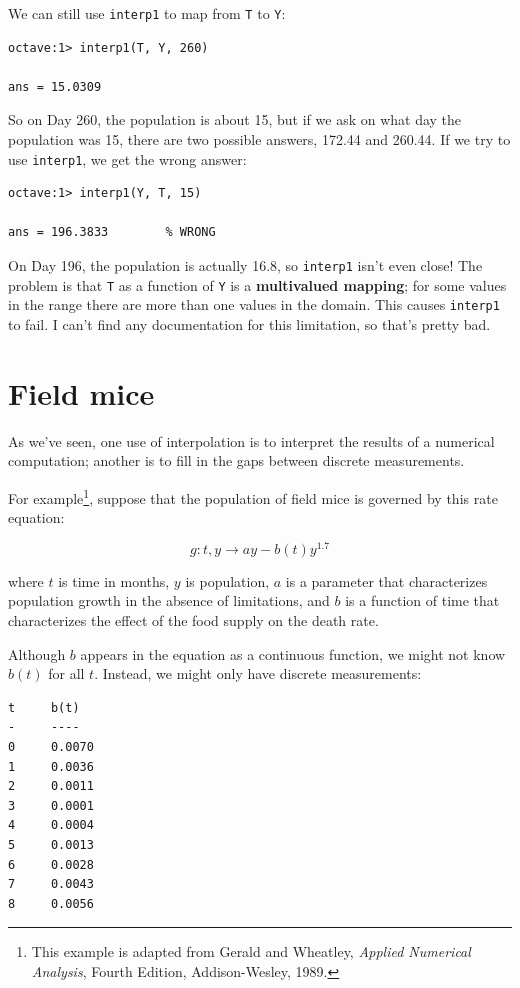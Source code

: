 \documentclass{book}
\begin{document}
We can still use {\tt interp1} to map from {\tt T} to {\tt Y}:

\begin{verbatim}
octave:1> interp1(T, Y, 260)

ans = 15.0309
\end{verbatim}

So on Day 260, the population is about 15, but if we ask on what
day the population was 15, there are two possible answers, 172.44
and 260.44. If we try to use {\tt interp1}, we get the wrong answer:

\begin{verbatim}
octave:1> interp1(Y, T, 15)     

ans = 196.3833        % WRONG
\end{verbatim}

On Day 196, the population is actually 16.8, so {\tt interp1} isn't
even close! The problem is that {\tt T} as a function of {\tt Y} is a
{\bf multivalued mapping}; for some values in the range there are more
than one values in the domain. This causes {\tt interp1} to fail. I
can't find any documentation for this limitation, so that's pretty
bad.


\section{Field mice}

As we've seen, one use of interpolation is to interpret the results
of a numerical computation; another is to fill in the gaps between
discrete measurements.

For example\footnote{This example is adapted from Gerald and Wheatley,
{\em Applied Numerical Analysis}, Fourth Edition, Addison-Wesley,
1989.}, suppose that the population of field mice is governed by this
rate equation:

\[ g : t,y \to ay - b(t) y^{1.7} \]

where $t$ is time in months, $y$ is population, $a$ is a parameter
that characterizes population growth in the absence of limitations,
and $b$ is a function of time that characterizes the effect of the
food supply on the death rate.

Although $b$ appears in the equation as a continuous function, we
might not know $b(t)$ for all $t$. Instead, we might only have discrete
measurements:

\begin{verbatim}
t     b(t)
-     ----
0     0.0070
1     0.0036       
2     0.0011
3     0.0001
4     0.0004
5     0.0013
6     0.0028
7     0.0043
8     0.0056
\end{verbatim}
\end{document}
